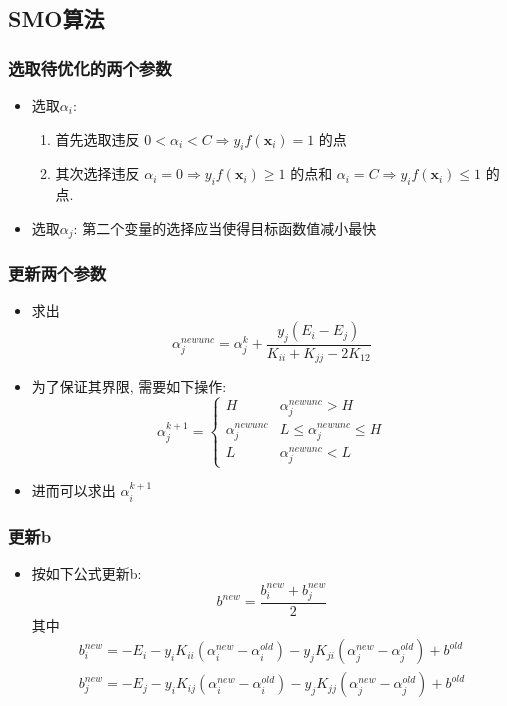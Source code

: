 \documentclass[UTF8]{article}
\begin{document}
\subsection{SMO算法}
\subsubsection{选取待优化的两个参数}
\begin{itemize}
	\item 选取$\alpha_i$: 
	\begin{enumerate}[1. ]
		\item 首先选取违反 $0<\alpha_i<C \Rightarrow y_if(\bm{x}_i)=1$ 的点
		\item 其次选择违反 $\alpha_i=0\Rightarrow y_if(\bm{x}_i)\ge1$ 的点和 $\alpha_i=C\Rightarrow y_if(\bm{x}_i)\le1$ 的点.
	\end{enumerate}
	\item 选取$\alpha_j$: 第二个变量的选择应当使得目标函数值减小最快
\end{itemize}
\subsubsection{更新两个参数}
\begin{itemize}
\item 求出 $$\alpha^{newunc}_j=\alpha_j^k+\frac{y_j(E_i-E_j)}{K_{ii}+K_{jj}-2K_{12}}$$
\item 为了保证其界限, 需要如下操作:
$$\alpha_j^{k+1}=\left\{\begin{array}{ll}
	H & \alpha_j^{newunc} > H\\
	\alpha_j^{newunc} & L\le  \alpha_j^{newunc}\le H\\
	L &  \alpha_j^{newunc} < L
\end{array}\right.$$
\item 进而可以求出 $\alpha_i^{k+1}$
\end{itemize}
\subsubsection{更新b}
\begin{itemize}
\item 按如下公式更新b:
$$b^{new}=\frac{b_i^{new}+b_j^{new}}{2}$$
其中$$\begin{array}{l}
b_i^{new}=-E_i-y_iK_{ii}(\alpha_i^{new}-\alpha_i^{old})-y_jK_{ji}(\alpha_j^{new}-\alpha_j^{old})+b^{old}\\
b_j^{new}=-E_j-y_iK_{ij}(\alpha_i^{new}-\alpha_i^{old})-y_jK_{jj}(\alpha_j^{new}-\alpha_j^{old})+b^{old}
\end{array}$$
\end{itemize}
\end{document}
